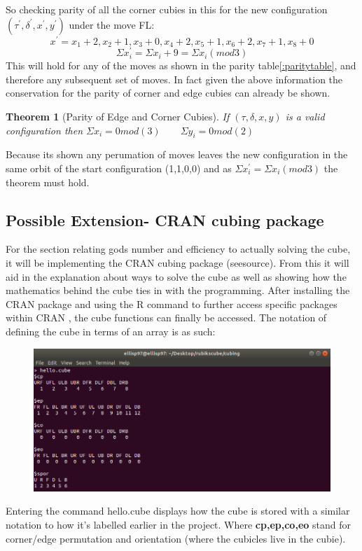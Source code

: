 \documentclass{article}
\newtheorem{theorem}{Theorem}[section]
\begin{document}
So checking parity of all the corner cubies in this for the new configuration $(\tau^{'},\delta^{'}, x^{'}, y^{'})$ under the move FL:
\begin{equation}
x^{'} = x_1 + 2, x_2 + 1, x_3 + 0, x_4 + 2, x_5 +1, x_6 + 2, x_7 + 1, x_8 + 0
\end{equation}
\begin{equation}
\Sigma{x_i^{'}} = \Sigma{x_i} + 9  = \Sigma{x_i} (mod 3)
\end{equation}
This will hold for any of the moves as shown in the parity table\ref{:paritytable}, and therefore any subsequent set of moves.
In fact given the above information the conservation for the parity of corner and edge cubies can already be shown.
\begin{theorem}[Parity of Edge and Corner Cubies]
If $(\tau,\delta, x, y)$ is a valid configuration then $\Sigma x_{i} =0mod(3) \qquad \Sigma y_{i} =0mod(2) $
\end{theorem}
Because its shown any perumation of moves leaves the new configuration in the same orbit of the start configuration (1,1,0,0) and as $\Sigma{x_i^{'}} = \Sigma{x_i} (mod 3)$ the theorem must hold.
 
\paragraph*{}
\newpage
\subsection*{Possible Extension- CRAN cubing package}

For the section relating gods number and efficiency to actually solving the cube, it will be implementing the CRAN cubing package (seesource). From this it will
aid in the explanation about ways to solve the cube as well as showing how the mathematics behind the cube ties in with the programming.
After installing the CRAN package and using the R command to further access specific packages within CRAN , the cube functions can finally be accessed. The notation of defining the cube in terms of an array is as such:

\begin{figure}[h]
	\centering
	\includegraphics[scale=.75]{terminalcube.png}
\end{figure}
Entering the command hello.cube displays how the cube is stored with a similar notation to how it's labelled earlier in the project. Where \textbf{cp,ep,co,eo} stand for corner/edge permutation and orientation (where the cubicles live in the cubie).
\end{document}
